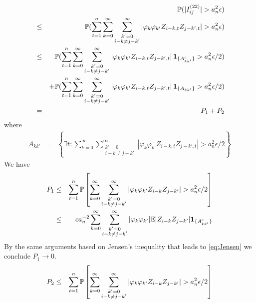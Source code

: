 \documentclass{article}
\begin{document}
\begin{eqnarray*}
  && \mathbb{P}(|I^{(22)}_{ij}| > a_n^2 \epsilon) \\
  &\leq& \mathbb{P}( \sum_{t=1}^n \sum_{k=0}^\infty \sum_{\substack{k'=0\\i-k
    \neq j-k'}}^\infty \left| \varphi_k \varphi_{k'} Z_{i-k,t} 
  Z_{j-k',t} \right| > a_n^2 \epsilon) \\
&\leq& \mathbb{P}( \sum_{t=1}^n \sum_{k=0}^\infty \sum_{\substack{k'=0\\i-k
    \neq j-k'}}^\infty \left| \varphi_k \varphi_{k'} Z_{i-k,t} 
  Z_{j-k',t} \right|\mathbf{1}_{\{A^c_{kk'}\}} > a_n^2 \epsilon/2) \\
&& + \mathbb{P}( \sum_{t=1}^n \sum_{k=0}^\infty \sum_{\substack{k'=0\\i-k
    \neq j-k'}}^\infty \left| \varphi_k \varphi_{k'} Z_{i-k,t} 
  Z_{j-k',t} \right|\mathbf{1}_{\{A_{kk'}\}} > a_n^2 \epsilon/2) \\
&=& P_1 + P_2
\end{eqnarray*}
where
\begin{eqnarray*}
  A_{kk'} &=& \left\{
    \exists t:\sum_{k=0}^\infty \sum_{\substack{k'=0\\i-k
    \neq j-k'}}^\infty \left| \varphi_k \varphi_{k'} Z_{i-k,t} 
  Z_{j-k',t} \right| > a_n^2 \epsilon/2 \right\}
\end{eqnarray*}
We have
\begin{eqnarray*}
  P_1 &\leq& \sum_{t=1}^n \mathbb{P}\left[
    \sum_{k=0}^\infty \sum_{\substack{k'=0\\i-k
        \neq j-k'}}^\infty \left| \varphi_k \varphi_{k'} Z_{i-k} 
      Z_{j-k'} \right| > a_n^2 \epsilon/2 \right] \\
  &\leq& c a_n^{-2} \sum_{k=0}^\infty \sum_{\substack{k'=0\\i-k
      \neq j-k'}}^\infty |\varphi_k \varphi_{k'}| \mathbb{E} |Z_{i-k} 
  Z_{j-k'}| \mathbf{1}_{\{A^c_{kk'}\}} \\
\end{eqnarray*}
By the same arguments based on Jensen's inequality that leads to
\eqref{eq:Jensen} we conclude $P_1 \to 0$.
\begin{eqnarray*}
  P_2 &\leq& \sum_{t=1}^n \mathbb{P}\left[
    \sum_{k=0}^\infty \sum_{\substack{k'=0\\i-k
        \neq j-k'}}^\infty \left| \varphi_k \varphi_{k'} Z_{i-k} 
      Z_{j-k'} \right| > a_n^2 \epsilon/2
  \right]
\end{eqnarray*}


\end{document}
